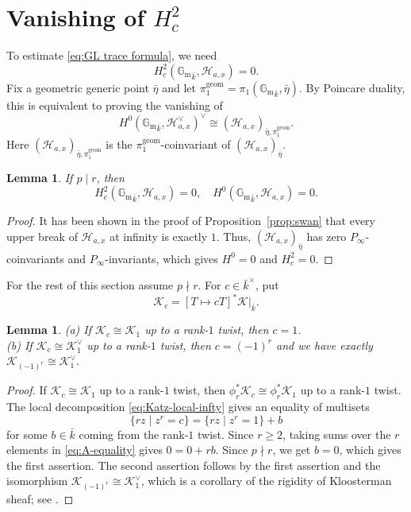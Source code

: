 \documentclass[11pt]{amsart}
\newtheorem{lemma}[theorem]{Lemma}
\theoremstyle{remark}
\newcommand{\Gm}{\mathbb G_{\mathrm m}}
\newcommand{\cK}{\mathcal K}
\newcommand{\cH}{\mathcal H}
\newcommand{\geom}{\mathrm{geom}}
\begin{document}
\section{Vanishing of \texorpdfstring{$H_c^2$}{Hc2}}\label{sec:H2}

To estimate \eqref{eq:GL trace formula}, we need
\[
        H_c^2({\Gm}_{\bar{k}},\cH_{a,x})=0.
\]
Fix a geometric generic point $\bar{\eta}$ and let $\pi_{1}^{\geom}=\pi_1({\Gm}_{\bar{k}},\bar{\eta})$. By Poincare duality, this is equivalent to proving the vanishing of
\begin{equation}\label{eq:geom coinv}
    H^0({\Gm}_{\bar{k}},\cH_{a,x}^{\vee})^{\vee}\cong(\cH_{a,x})_{\bar{\eta},\pi_{1}^{\geom}}.
\end{equation}
Here $(\cH_{a,x})_{\bar{\eta},\pi_{1}^{\geom}}$ is the $\pi_{1}^{\geom}$-coinvariant of $(\cH_{a,x})_{\bar{\eta}}$.   

\begin{lemma}\label{lem:H2-p-divides-r}
If $p\mid r$, then
\[
H_c^2({\Gm}_{\bar{k}},\cH_{a,x})=0,\quad H^0({\Gm}_{\bar{k}},\cH_{a,x})=0.
\]
\end{lemma}

\begin{proof}
It has been shown in the proof of Proposition~\ref{prop:swan} that every upper break of $\cH_{a,x}$ at infinity is exactly $1$. Thus, $(\cH_{a,x})_{\bar{\eta}}$ has zero $P_\infty$-coinvariants and $P_\infty$-invariants, which gives $H^0=0$ and $H_c^2=0$.
\end{proof}

For the rest of this section assume $p\nmid r$. For $c\in\bar{k}^\times$, put
\[
\cK_c=[T\mapsto cT]^*\cK|_{\bar{k}}.
\]

\begin{lemma}\label{lem:twists-duals}
(a) If $\cK_c\cong\cK_1$ up to a rank-$1$ twist, then $c=1$.\\
(b) If $\cK_c\cong\cK_{1}^\vee$ up to a rank-$1$ twist, then $c=(-1)^r$ and we have exactly $\cK_{(-1)^r}\cong\cK_{1}^\vee$.
\end{lemma}

\begin{proof}
If $\cK_c\cong\cK_1$ up to a rank-$1$ twist, then $\phi_r^*\cK_c\cong\phi_r^*\cK_1$ up to a rank-$1$ twist. The local decomposition \eqref{eq:Katz-local-infty} gives an equality of multisets
\begin{equation}\label{eq:A-equality}
        \{rz\mid z^r=c\}=\{rz\mid z^r=1\}+b
\end{equation}
for some $b\in\bar{k}$ coming from the rank-$1$ twist. Since $r\ge 2$, taking sums over the $r$ elements in \eqref{eq:A-equality} gives $0=0+rb$.
Since $p\nmid r$, we get $b=0$, which gives the first assertion. The second assertion follows by the first assertion and the isomorphism $\cK_{(-1)^r}\cong\cK_{1}^\vee$, which is a corollary of the rigidity of Kloosterman sheaf; see \cite[Corollary~4.1.4]{KatzGKM}.
\end{proof}
\end{document}
